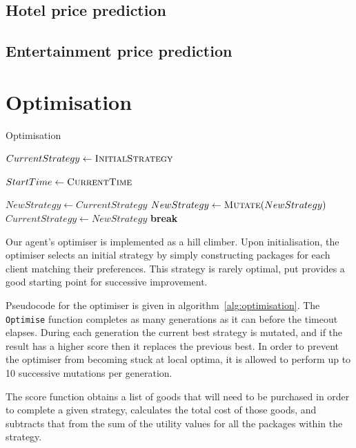 \documentclass[a4paper]{proc}
\newcommand{\Break}{\State \textbf{break}}
\begin{document}
\subsection{Hotel price prediction}

\subsection{Entertainment price prediction}

\section{Optimisation}

\begin{algorithm}
  \caption{Optimisation}
  \label{alg:optimisation}
  \begin{algorithmic}
    \small
    \State $CurrentStrategy \gets \Call{InitialStrategy}{}$

      \State $StartTime \gets \Call{CurrentTime}{}$

        \State $NewStrategy \gets CurrentStrategy$
          \State $NewStrategy \gets \Call{Mutate}{NewStrategy}$
            \State $CurrentStrategy \gets NewStrategy$
            \Break
          \EndIf
        \EndFor
      \EndWhile
      \State {}
    \EndFunction
  \end{algorithmic}
\end{algorithm}

Our agent's optimiser is implemented as a hill climber. Upon initialisation, the optimiser selects an initial strategy by simply constructing packages for each client matching their preferences. This strategy is rarely optimal, put provides a good starting point for successive improvement.

Pseudocode for the optimiser is given in algorithm~\ref{alg:optimisation}. The \texttt{Optimise} function completes as many generations as it can before the timeout elapses. During each generation the current best strategy is mutated, and if the result has a higher score then it replaces the previous best. In order to prevent the optimiser from becoming stuck at local optima, it is allowed to perform up to 10 successive mutations per generation.

The score function obtains a list of goods that will need to be purchased in order to complete a given strategy, calculates the total cost of those goods, and subtracts that from the sum of the utility values for all the packages within the strategy.
\end{document}
